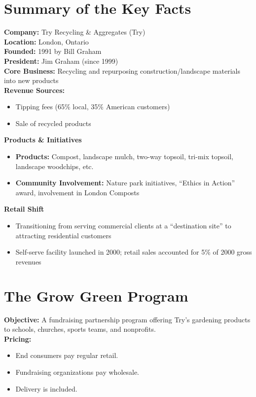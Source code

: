 \documentclass[12pt]{article}
\begin{document}
\section*{Summary of the Key Facts}

\textbf{Company:} Try Recycling \& Aggregates (Try) \\
\textbf{Location:} London, Ontario \\
\textbf{Founded:} 1991 by Bill Graham \\
\textbf{President:} Jim Graham (since 1999) \\
\textbf{Core Business:} Recycling and repurposing construction/landscape materials into new products \\

\noindent
\textbf{Revenue Sources:}
\begin{itemize}
    \item Tipping fees (65\% local, 35\% American customers)
    \item Sale of recycled products
\end{itemize}

\noindent
\textbf{Products \& Initiatives}
\begin{itemize}
    \item \textbf{Products:} Compost, landscape mulch, two-way topsoil, tri-mix topsoil, landscape woodchips, etc.
    \item \textbf{Community Involvement:} Nature park initiatives, ``Ethics in Action'' award, involvement in London Composts
\end{itemize}

\noindent
\textbf{Retail Shift}
\begin{itemize}
    \item Transitioning from serving commercial clients at a ``destination site'' to attracting residential customers 
    \item Self-serve facility launched in 2000; retail sales accounted for 5\% of 2000 gross revenues
\end{itemize}

\section*{The Grow Green Program}

\textbf{Objective:} A fundraising partnership program offering Try’s gardening products to schools, churches, sports teams, and nonprofits. \\
\textbf{Pricing:}
\begin{itemize}
    \item End consumers pay regular retail.
    \item Fundraising organizations pay wholesale.
    \item Delivery is included.
\end{itemize}
\end{document}
